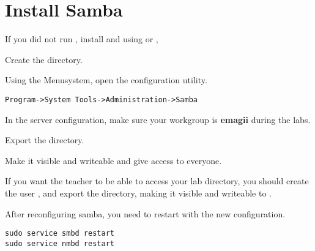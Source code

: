
\section{Install Samba}

If you did not run , 
install  and 
using  or , 

Create the  directory.

Using the Menusystem, open the  configuration utility.

\begin{verbatim}
Program->System Tools->Administration->Samba
\end{verbatim}

In the server configuration, make sure your workgroup is {\bf emagii} during the labs.

Export the  directory.

Make it visible and writeable and give access to everyone.

If you want the teacher to be able to access your lab directory, 
you should create the user \teacher, and export the \labdir directory,
making it visible and writeable to \teacher.

After reconfiguring samba, you need to restart with the new configuration.

\begin{verbatim}
sudo service smbd restart
sudo service nmbd restart
\end{verbatim}
